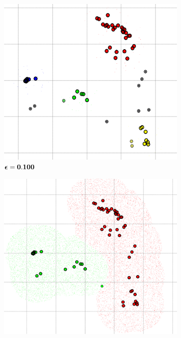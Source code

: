\begin{figure} [ht]
\centering
	\begin{subfigure}[h]{0.30\textwidth}
    \centering
	\includegraphics[height=0.08\textheight]{./clustering/dbs_scan_eps_0100_min_3.png}
	\caption{$\boldsymbol \epsilon \bf= 0.100$}
	\end{subfigure}
    \begin{subfigure}[h]{0.30\textwidth}
    \centering
    \includegraphics[height=0.08\textheight]{./clustering/dbs_scan_eps_0230_min_3.png}

\end{subfigure}
\end{figure}
